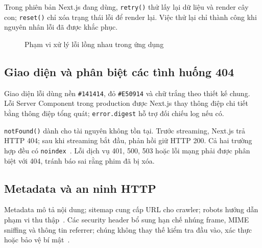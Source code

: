\documentclass[12pt,a4paper]{extarticle}
\begin{document}
Trong phiên bản Next.js đang dùng, \texttt{retry()} thử lấy lại dữ liệu và render cây con; \texttt{reset()} chỉ xóa trạng thái lỗi để render lại. Việc thử lại chỉ thành công khi nguyên nhân lỗi đã được khắc phục.
\begin{figure}[H]
\centering
{}
\caption{Phạm vi xử lý lỗi lồng nhau trong ứng dụng}
\end{figure}

\subsection{Giao diện và phân biệt các tình huống 404}
Giao diện lỗi dùng nền \texttt{\#141414}, đỏ \texttt{\#E50914} và chữ trắng theo thiết kế chung. Lỗi Server Component trong production được Next.js thay thông điệp chi tiết bằng thông điệp tổng quát; \texttt{error.digest} hỗ trợ đối chiếu log nếu có.

\texttt{notFound()} dành cho tài nguyên không tồn tại. Trước streaming, Next.js trả HTTP 404; sau khi streaming bắt đầu, phản hồi giữ HTTP 200. Cả hai trường hợp đều có \texttt{noindex}~\cite{nextjs-notfound}. Lỗi dịch vụ 401, 500, 503 hoặc lỗi mạng phải được phân biệt với 404, tránh báo sai rằng phim đã bị xóa.

\subsection{Metadata và an ninh HTTP}
Metadata mô tả nội dung; sitemap cung cấp URL cho crawler; robots hướng dẫn phạm vi thu thập~\cite{nextjs-metadata}. Các security header bổ sung hạn chế nhúng frame, MIME sniffing và thông tin referrer; chúng không thay thế kiểm tra đầu vào, xác thực hoặc bảo vệ bí mật~\cite{owasp-headers}.
\end{document}
